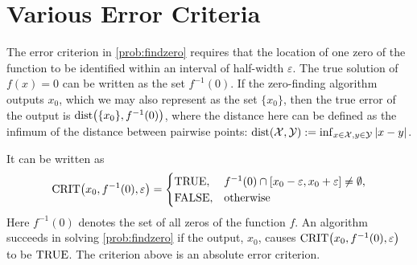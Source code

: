 \chapter{Various Error Criteria} \label{chap:relerror}
The error criterion in \cref{prob:findzero} requires that the location of one zero of the function to be identified within an interval of half-width $\varepsilon$.  The true solution of $f(x) = 0$ can be written as the set $f^{-1}(0)$.  If the zero-finding algorithm outputs $x_0$, which we may also represent as the set $\{x_0\}$, then the true error of the output is $\operatorname{dist}\bigl(\{x_0\},f^{-1}(0)\bigr)$, where the distance here can be defined as the infimum of the distance between pairwise points: $\operatorname{dist}(\mathcal{X},\mathcal{Y}) := \inf_{x \in \mathcal{X}, y \in \mathcal{Y}} \left \lvert x-y \right \rvert$.



It can be written as
\begin{equation}
    \operatorname{CRIT}\bigl(x_0,f^{-1}(0),\varepsilon\bigr) = 
    \begin{cases} \textup{TRUE}, & f^{-1}(0) \cap [x_0 - \varepsilon, x_0 + \varepsilon] \ne \emptyset,\\
    \textup{FALSE}, & \text{otherwise}
    \end{cases}
\end{equation}
Here $f^{-1}(0)$ denotes the set of all zeros of the function $f$.  An algorithm succeeds in solving \cref{prob:findzero} if the output, $x_0$, causes $\operatorname{CRIT}\bigl(x_0,f^{-1}(0),\varepsilon\bigr)$ to be $\textup{TRUE}$.  The criterion above is an absolute error criterion.
